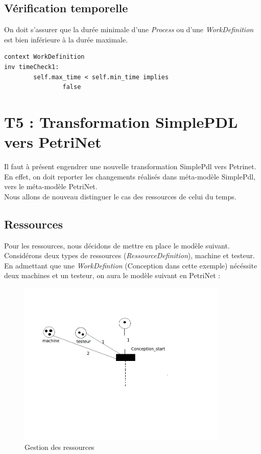 \documentclass{report}
\begin{document}
\subsection{Vérification temporelle}

On doit s'assurer que la durée minimale d'une \textit{Process} ou d'une \textit{WorkDefinition} est bien inférieure à la durée maximale.

\begin{verbatim}
context WorkDefinition
inv timeCheck1:
        self.max_time < self.min_time implies
                false
\end{verbatim}

\section{T5 : Transformation SimplePDL vers PetriNet}

Il faut à présent engendrer une nouvelle transformation SimplePdl vers Petrinet. En effet, on doit reporter les changements réalisés dans méta-modèle SimplePdl, vers le méta-modèle PetriNet.\\

Nous allons de nouveau distinguer le cas des ressources de celui du temps.

\subsection{Ressources}

Pour les ressources, nous décidons de mettre en place le modèle suivant. Considérons deux types de ressources (\textit{RessourceDefinition}), machine et testeur.
En admettant que une \textit{WorkDefintion} (Conception dans cette exemple) nécéssite deux machines et un testeur, on aura le modèle suivant en PetriNet :\\

\begin{figure}[!h] 
\begin{center}
\includegraphics[width=10cm]{petri1.png}
\caption{Gestion des ressources} 
\label{img1} 
\end{center}
\end{figure} 
\end{document}
